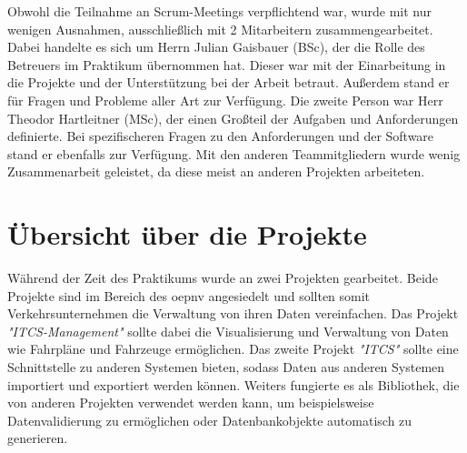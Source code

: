     Obwohl die Teilnahme an Scrum-Meetings verpflichtend war, wurde mit nur wenigen Ausnahmen, ausschließlich mit 2 Mitarbeitern zusammengearbeitet. Dabei handelte es sich um Herrn Julian Gaisbauer 
    (BSc), der die Rolle des Betreuers im Praktikum übernommen hat. Dieser war mit der Einarbeitung in die Projekte und der Unterstützung bei der Arbeit betraut. Außerdem stand er für 
    Fragen und Probleme aller Art zur Verfügung. Die zweite Person war Herr Theodor Hartleitner (MSc), der einen Großteil der Aufgaben und Anforderungen definierte. Bei spezifischeren 
    Fragen zu den Anforderungen und der Software stand er ebenfalls zur Verfügung. Mit den anderen Teammitgliedern wurde wenig Zusammenarbeit geleistet, da diese meist an anderen Projekten arbeiteten.


\section{Übersicht über die Projekte}\label{sec:ueberblick-projekte}
    Während der Zeit des Praktikums wurde an zwei Projekten gearbeitet. Beide Projekte sind im Bereich des \gls{oepnv} angesiedelt und sollten somit Verkehrsunternehmen die Verwaltung von ihren Daten 
    vereinfachen. Das Projekt \emph{"ITCS-Management"} sollte dabei die Visualisierung und Verwaltung von Daten wie Fahrpläne und Fahrzeuge ermöglichen. Das zweite Projekt 
    \emph{"ITCS"} sollte eine Schnittstelle zu anderen Systemen bieten, sodass Daten aus anderen Systemen importiert und exportiert werden können. Weiters fungierte es als Bibliothek, 
    die von anderen Projekten verwendet werden kann, um beispielsweise Datenvalidierung zu ermöglichen oder Datenbankobjekte automatisch zu generieren.


